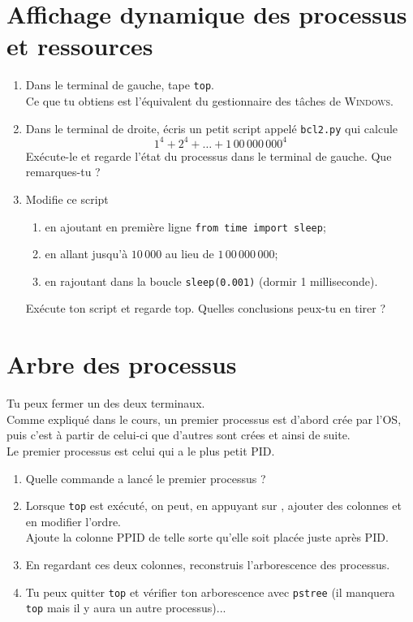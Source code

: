 \documentclass[a4paper,12pt,french]{book}
\begin{document}
\section*{Affichage dynamique des processus et ressources}
\begin{enumerate}
	\item Dans le terminal de gauche, tape \texttt{top}.\\
     Ce que tu obtiens est l'équivalent du gestionnaire des tâches de \textsc{Windows}.\\
     \item Dans le terminal de droite, écris un petit script appelé \texttt{bcl2.py} qui calcule
     $$1^4+2^4+\ldots+1\,00\,000\,000^4$$
     Exécute-le et regarde l'état du processus dans le terminal de gauche. Que remarques-tu ?
     \item Modifie ce script
     \begin{enumerate}[--]
     	\item en ajoutant en première ligne \texttt{from time import sleep};
         \item en allant jusqu'à $10\,000$ au lieu de $1\,00\,000\,000$;
         \item en rajoutant dans la boucle \texttt{sleep(0.001)} (dormir 1 milliseconde).
     \end{enumerate}
     Exécute ton script et regarde top. Quelles conclusions peux-tu en tirer ?
\end{enumerate}
\section*{Arbre des processus}
Tu peux fermer un des deux terminaux.\\

Comme expliqué dans le cours, un premier processus est d'abord crée par l'OS, puis c'est à partir de celui-ci que d'autres sont crées et ainsi de suite.\\
Le premier processus est celui qui a le plus petit PID.\\
\begin{enumerate}
	\item 	Quelle commande a lancé le premier processus ?
	\item 	Lorsque \texttt{top} est exécuté, on peut, en appuyant sur  , ajouter des colonnes et en modifier l'ordre.\\
            Ajoute la colonne PPID de telle sorte qu'elle soit placée juste après PID.
     \item 	En regardant ces deux colonnes, reconstruis l'arborescence des processus.
     \item 	Tu peux quitter \texttt{top} et vérifier ton arborescence avec \texttt{pstree} (il manquera \texttt{top} mais il y aura un autre processus)...
     \end{enumerate}
\end{document}
